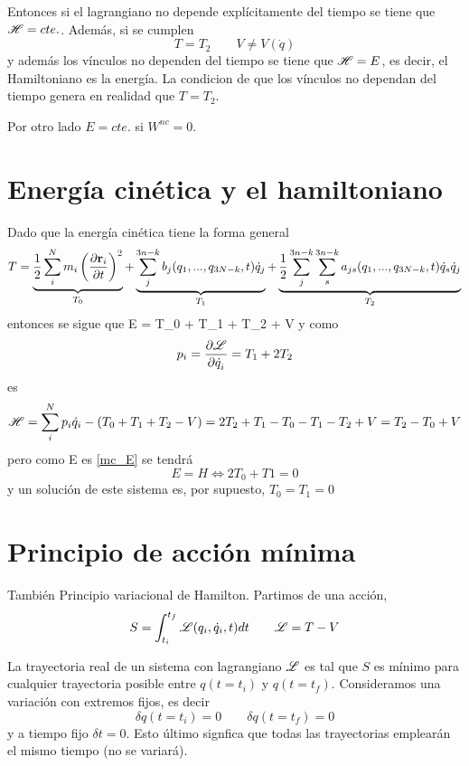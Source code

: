 \documentclass[10pt,oneside]{CBFT_book}
\begin{document}
Entonces si el lagrangiano no depende explícitamente del tiempo se tiene que $\mathscr{H} = cte.$. Además,
si se cumplen 
\[
	T=T_2 \qquad V \neq V(\dot{q})
\]
y además los vínculos no dependen del tiempo se tiene que $\mathscr{H}=E$, es decir, el Hamiltoniano es la
energía. La condicion de que los vínculos no dependan del tiempo genera en realidad que $T=T_2$.

Por otro lado $E = cte.$ si $W^{nc} = 0$.

\section{Energía cinética y el hamiltoniano}

Dado que la energía cinética tiene la forma general
\[
	T = \underbrace{\frac{1}{2} \sum_i^N m_i \left( \dpar{\vb{r}_i}{t} \right)^2}_{T_0}  +
	\underbrace{\sum_j^{3n-k} b_j(q_1,...,q_{3N-k},t)\dot{q}_j  }_{T_1} +
	\underbrace{\frac{1}{2} \sum_j^{3n-k}\sum_s^{3n-k}  a_{js}(q_1,...,q_{3N-k},t)\dot{q}_s\dot{q}_j }_{T_2}
\]
entonces se sigue que 
\be
	E = T_0 + T_1 + T_2 + V
\label{mc_E}
\ee
y como 
\[
	p_i = \frac{\partial^{\hspace{-0.05em}} {\mathscr{L}}}{\partial {\dot{q}_i}^{\hspace{-0.05em}}} = T_1 + 2T_2 
\]
es 
\[
	\mathscr{H} = \sum_i^N p_i\dot{q}_i - (T_0 + T_1 + T_2 - V) = 2T_2 + T_1 - T_0 - T_1 - T_2 + V = T_2 - T_0 + V
\]
pero como E es \eqref{mc_E} se tendrá 
\[
	E = H \iff 2T_0 + T1 = 0
\]
y un solución de este sistema es, por supuesto, $T_0 = T_1 = 0$

\section{Principio de acción mínima}

También Principio variacional de Hamilton. Partimos de una acción,
\[
	S = \int_{t_i}^{t_f} \mathscr{L}( q_i, \dot{q}_i, t ) dt \qquad \mathscr{L} = T-V
\]

La trayectoria real de un sistema con lagrangiano $\mathscr{L}$ es tal que $S$ es mínimo para cualquier 
trayectoria posible entre $q(t=t_i)$ y $q(t=t_f)$. Consideramos una variación con extremos fijos,
es decir 
\[
	\delta q(t=t_i) = 0 \qquad \delta q(t=t_f) = 0
\]
y a tiempo fijo $\delta t = 0$. Esto último signfica que todas las trayectorias emplearán el 
mismo tiempo (no se variará).
\end{document}
